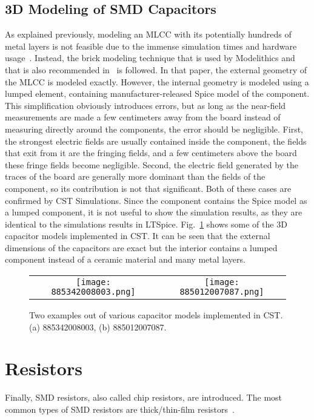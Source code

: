 \subsection{3D Modeling of SMD Capacitors}
As explained previously, modeling an MLCC with its potentially hundreds of metal layers is not feasible due to the immense simulation times and hardware usage~\cite{8094717}. Instead, the brick modeling technique that is used by Modelithics and that is also recommended in~\cite{8094717} is followed. In that paper, the external geometry of the MLCC is modeled exactly. However, the internal geometry is modeled using a lumped element, containing manufacturer-released Spice model of the component. This simplification obviously introduces errors, but as long as the near-field measurements are made a few centimeters away from the board instead of  measuring directly around the components, the error should be negligible. First, the strongest electric fields are usually contained inside the component, the fields that exit from it are the fringing fields, and a few centimeters above the board these fringe fields become negligible. Second, the electric field generated by the traces of the board are generally more dominant than the fields of the component, so its contribution is not that significant. Both of these cases are confirmed by CST Simulations. Since the component contains the Spice model as a lumped component, it is not useful to show the simulation results, as they are identical to the simulations results in LTSpice. Fig.~\ref{fig:cst_mlcc} shows some of the 3D capacitor models implemented in CST. It can be seen that the external dimensions of the capacitors are exact but the interior contains a lumped component instead of a ceramic material and many metal layers.
\begin{figure}[ptb]
	\centering
	\begin{tabular}{cc}
		\texttt{[image: 885342008003.png]}&
		\texttt{[image: 885012007087.png]}
	\end{tabular}
	\caption{Two examples out of various capacitor models implemented in CST. (a) 885342008003, (b) 885012007087.}
	\label{fig:cst_mlcc}
\end{figure}
\section{Resistors}
Finally, SMD resistors, also called chip resistors, are introduced. The most common types of SMD resistors are thick/thin-film resistors~\cite{digikey}.
